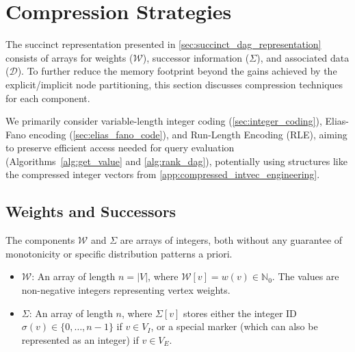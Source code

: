 \section{Compression Strategies}
\label{sec:compression_strategies}

The succinct representation presented in \autoref{sec:succinct_dag_representation} consists of arrays for weights ($\mathcal{W}$), successor information ($\Sigma$), and associated data ($\mathcal{D}$). To further reduce the memory footprint beyond the gains achieved by the explicit/implicit node partitioning, this section discusses compression techniques for each component.

We primarily consider variable-length integer coding (\autoref{sec:integer_coding}), Elias-Fano encoding (\autoref{sec:elias_fano_code}), and Run-Length Encoding (RLE), aiming to preserve efficient access needed for query evaluation (Algorithms~\ref{alg:get_value} and \ref{alg:rank_dag}), potentially using structures like the compressed integer vectors from \autoref{app:compressed_intvec_engineering}.

\subsection{Weights and Successors}
\label{subsec:compressing_W_Sigma}

The components $\mathcal{W}$ and $\Sigma$ are arrays of integers, both without any guarantee of monotonicity or specific distribution patterns a priori.
\begin{itemize}
    \item $\mathcal{W}$: An array of length $n = |V|$, where $\mathcal{W}[v] = w(v) \in \mathbb{N}_0$. The values are non-negative integers representing vertex weights.
    \item $\Sigma$: An array of length $n$, where $\Sigma[v]$ stores either the integer ID $\sigma(v) \in \{0, \dots, n-1\}$ if $v \in V_I$, or a special marker (which can also be represented as an integer) if $v \in V_E$.
\end{itemize}


